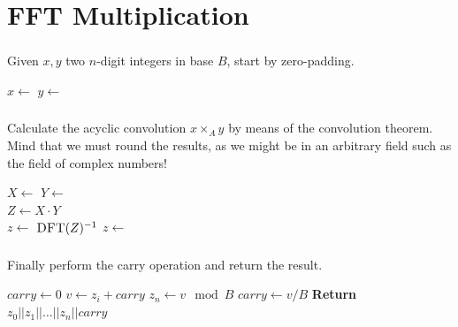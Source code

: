 \documentclass{beamer}
\begin{document}
\section{FFT Multiplication}

\begin{frame}
		\frametitle{\secname}

		Given $x, y$ two $n$-digit integers in base $B$, start by zero-padding.

		\begin{algorithmic}[1]
				 
				\State $x \gets$  
				\State $y \gets$ 
		\end{algorithmic}
\end{frame}

\begin{frame}
		\frametitle{\secname}

		Calculate the acyclic convolution $x \times_A y$ by means of the
		convolution theorem. Mind that we must round the results, as we might
		be in an arbitrary field such as the field of complex numbers!

		\begin{algorithmic}[1]
				\State $X \gets$ 
				\State $Y \gets$ 
				\\
				\State $Z \gets X \cdot Y$ 
				\\
				\State $z \gets$ $\Call{DFT}{Z}^{-1}$
				\State $z \gets$ 
		\end{algorithmic}
\end{frame}

\begin{frame}
		\frametitle{\secname}

		Finally perform the carry operation and return the result.

		\begin{algorithmic}[1]
				\State $carry \gets 0$
				  \State $v \gets z_i + carry$
				  \State $z_n \gets v \mod B$
				  \State $carry \gets v / B$ 
				\EndFor
				\State \textbf{Return} $z_0 || z_1 || \ldots || z_n || carry$ 
				\EndFunction
		\end{algorithmic}
\end{frame}
\end{document}
